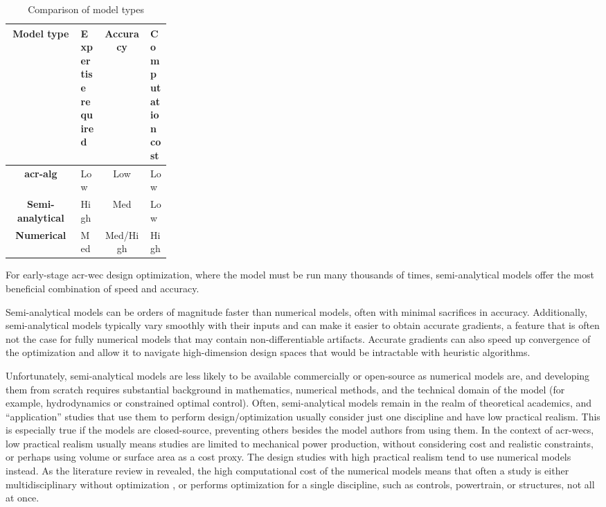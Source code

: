 \begin{table}[htbp]
    \centering
    \caption{Comparison of model types}
    \label{tab:model-types}
\begin{tabular}{cM{0.14\linewidth}cM{0.13\linewidth}}
         \textbf{Model type}&  \textbf{Expertise required}&  \textbf{Accuracy}&  \textbf{Computation cost}\\ \hline
         \textbf{\gls{acr-alg}}&  Low&  Low&  Low\\
         \textbf{Semi-analytical}&  High&  Med&  Low\\
         \textbf{Numerical}&  Med&  Med/High&  High\\
    \end{tabular}
    \end{table}

For early-stage \gls{acr-wec} design optimization, where the model must be run many thousands of times, semi-analytical models offer the most beneficial combination of speed and accuracy.

\ifdefined\DISSERTATION
    Semi-analytical models can be orders of magnitude faster than numerical models, often with minimal sacrifices in accuracy.
    Additionally, semi-analytical models typically vary smoothly with their inputs and can make it easier to obtain accurate gradients, a feature that is often not the case for fully numerical models that may contain non-differentiable artifacts.
    Accurate gradients can also speed up convergence of the optimization and allow it to navigate high-dimension design spaces that would be intractable with heuristic algorithms.

    Unfortunately, semi-analytical models are less likely to be available commercially or open-source as numerical models are, and developing them from scratch requires substantial background in mathematics, numerical methods, and the technical domain of the model (for example, hydrodynamics or constrained optimal control).
    Often, semi-analytical models remain in the realm of theoretical academics, and ``application'' studies that use them to perform design/optimization usually consider just one discipline and have low practical realism.
    This is especially true if the models are closed-source, preventing others besides the model authors from using them.
    In the context of \glspl{acr-wec}, low practical realism usually means studies are limited to mechanical power production, without considering cost and realistic constraints, or perhaps using volume or surface area as a cost proxy.
    The design studies with high practical realism tend to use numerical models instead.
    As the literature review in  revealed, the high computational cost of the numerical models means that often a study is either multidisciplinary without optimization \citep{RM3,mi_multi-scale_2025}, or performs optimization for a single discipline, such as controls, powertrain, or structures, not all at once.

